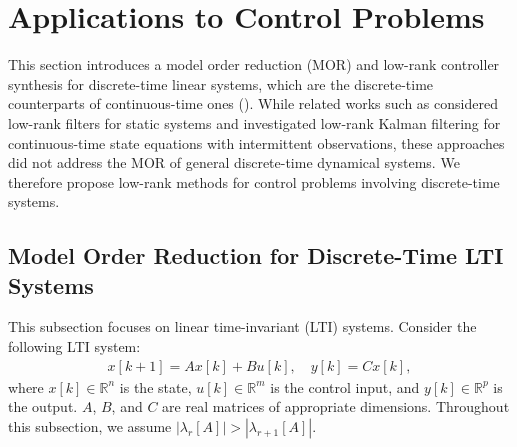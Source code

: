 \documentclass{ifacconf}
\begin{document}
\section{Applications to Control Problems}
\label{sec:ModelReduction}


This section introduces a model order reduction (MOR) and low-rank controller synthesis for discrete-time linear systems, which are the discrete-time counterparts of continuous-time ones (\cite{TsuzukiOhki2025global}). 
While related works such as \cite{hua2001optimal} considered low-rank filters for static systems and \cite{TsuzukiOhki2024a} investigated low-rank Kalman filtering for continuous-time state equations with intermittent observations, these approaches did not address the MOR of general discrete-time dynamical systems. We therefore propose low-rank methods for control problems involving discrete-time systems.



\subsection{Model Order Reduction for Discrete-Time LTI Systems}

This subsection focuses on linear time-invariant (LTI) systems. Consider the following LTI system:
\begin{align}
    x[k+1] = Ax[k] + Bu[k],\quad y[k] = Cx[k],
    \label{eq:discrete_time_LTI}
\end{align}
where $x[k] \in \mathbb{R}^{n}$ is the state, $u[k] \in \mathbb{R}^{m}$ is the control input, and $y[k] \in \mathbb{R}^{p}$ is the output. $A$, $B$, and $C$ are real matrices of appropriate dimensions. 
Throughout this subsection, we assume $|\lambda _{r}[A]| > | \lambda _{r+1}[A]|$. 
\end{document}
